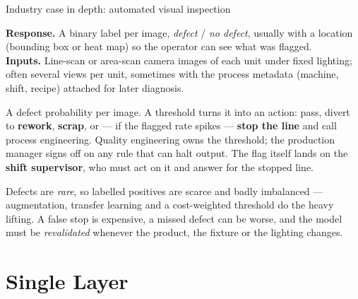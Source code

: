 \documentclass[aspectratio=169,11pt]{beamer}
\begin{document}
\begin{frame}{Industry case in depth: automated visual inspection}
  \footnotesize
  \begin{industry}
    \textbf{Response.} A binary label per image, \emph{defect} / \emph{no defect}, usually
    with a location (bounding box or heat map) so the operator can see what was flagged.\\
    \textbf{Inputs.} Line-scan or area-scan camera images of each unit under fixed
    lighting; often several views per unit, sometimes with the process metadata (machine,
    shift, recipe) attached for later diagnosis.
  \end{industry}
  \begin{readme}
    A defect probability per image. A threshold turns it into an action: pass, divert to
    \textbf{rework}, \textbf{scrap}, or --- if the flagged rate spikes --- \textbf{stop the
    line} and call process engineering. Quality engineering owns the threshold; the
    production manager signs off on any rule that can halt output. The flag itself lands on
    the \textbf{shift supervisor}, who must act on it and answer for the stopped line.
  \end{readme}
  \begin{takeaway}
    Defects are \emph{rare}, so labelled positives are scarce and badly imbalanced ---
    augmentation, transfer learning and a cost-weighted threshold do the heavy lifting. A
    false stop is expensive, a missed defect can be worse, and the model must be
    \emph{revalidated} whenever the product, the fixture or the lighting changes.
  \end{takeaway}
\end{frame}


\section{Single Layer}
\end{document}
